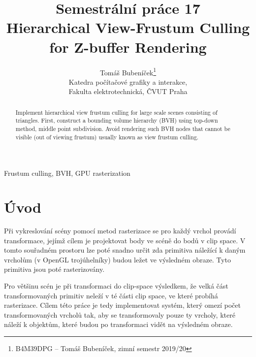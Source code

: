\documentclass[report,11pt]{elsarticle}
\begin{document}
\begin{frontmatter}

\title{Semestrální práce 17\\ Hierarchical View-Frustum Culling for Z-buffer Rendering}

\author{Tomáš Bubeníček\footnote{B4M39DPG -- Tomáš Bubeníček, zimní semestr 2019/20}\\
Katedra počítačové grafiky a interakce,\\ Fakulta elektrotechnická, ČVUT Praha
}

\date{}


\begin{abstract}
Implement hierarchical view frustum culling for large scale scenes consisting of
triangles. First, construct a bounding volume hierarchy (BVH) using top-down method,
middle point subdivision. Avoid rendering such BVH nodes that cannot be visible
(out of viewing frustum) usually known as view frustum culling.
\end{abstract}

\begin{keyword}
Frustum culling, BVH, GPU rasterization
\end{keyword}

\end{frontmatter}

\section{\label{SEC:Intro}Úvod}

Při vykreslování scény pomocí metod rasterizace se pro každý vrchol provádí
transformace, jejímž cílem je projektovat body ve scéně do bodů v clip space.
V tomto souřadném prostoru lze poté snadno určit zda primitiva náležící k daným
vrcholům (v OpenGL trojúhelníky) budou ležet ve výsledném obraze. Tyto
primitiva jsou poté rasterizovány.

Pro většinu scén je při transformaci do clip-space výsledkem, že velká část
transformovaných primitiv neleží v té části clip space, ve které probíhá
rasterizace. Cílem této práce je tedy implementovat systém, který omezí počet
transformovaných vrcholů tak, aby se transformovaly pouze ty vrcholy, které
náleží k objektům, které budou po transformaci vidět na výsledném obraze.
\end{document}
